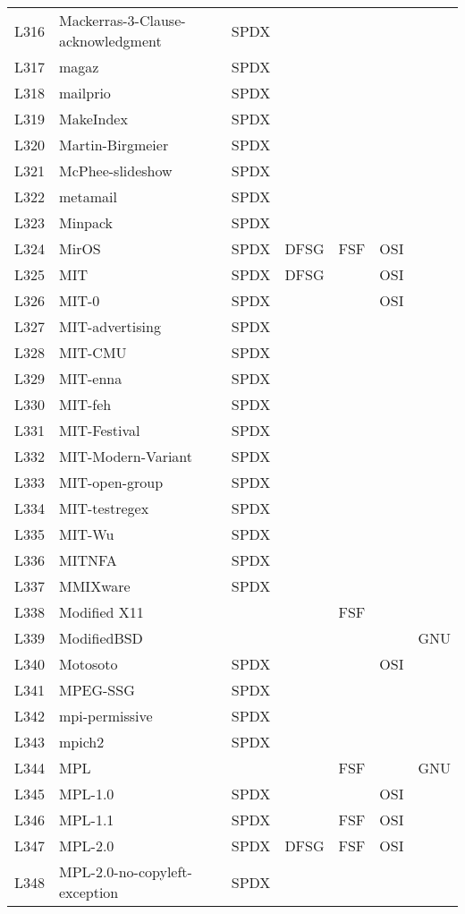 \begin{longtable}[h]{m{2cm} | m{7cm} | c | c | c | c | c}
L316 & Mackerras-3-Clause-acknowledgment & SPDX &  &  &  &  \\
L317 & magaz & SPDX &  &  &  &  \\
L318 & mailprio & SPDX &  &  &  &  \\
L319 & MakeIndex & SPDX &  &  &  &  \\
L320 & Martin-Birgmeier & SPDX &  &  &  &  \\
L321 & McPhee-slideshow & SPDX &  &  &  &  \\
L322 & metamail & SPDX &  &  &  &  \\
L323 & Minpack & SPDX &  &  &  &  \\
L324 & MirOS & SPDX & DFSG & FSF & OSI &  \\
L325 & MIT & SPDX & DFSG &  & OSI &  \\
L326 & MIT-0 & SPDX &  &  & OSI &  \\
L327 & MIT-advertising & SPDX &  &  &  &  \\
L328 & MIT-CMU & SPDX &  &  &  &  \\
L329 & MIT-enna & SPDX &  &  &  &  \\
L330 & MIT-feh & SPDX &  &  &  &  \\
L331 & MIT-Festival & SPDX &  &  &  &  \\
L332 & MIT-Modern-Variant & SPDX &  &  &  &  \\
L333 & MIT-open-group & SPDX &  &  &  &  \\
L334 & MIT-testregex & SPDX &  &  &  &  \\
L335 & MIT-Wu & SPDX &  &  &  &  \\
L336 & MITNFA & SPDX &  &  &  &  \\
L337 & MMIXware & SPDX &  &  &  &  \\
L338 & Modified X11 &  &  & FSF &  &  \\
L339 & ModifiedBSD &  &  &  &  & GNU \\
L340 & Motosoto & SPDX &  &  & OSI &  \\
L341 & MPEG-SSG & SPDX &  &  &  &  \\
L342 & mpi-permissive & SPDX &  &  &  &  \\
L343 & mpich2 & SPDX &  &  &  &  \\
L344 & MPL &  &  & FSF &  & GNU \\
L345 & MPL-1.0 & SPDX &  &  & OSI &  \\
L346 & MPL-1.1 & SPDX &  & FSF & OSI &  \\
L347 & MPL-2.0 & SPDX & DFSG & FSF & OSI &  \\
L348 & MPL-2.0-no-copyleft-exception & SPDX &  &  &  &  \\

\end{longtable}
